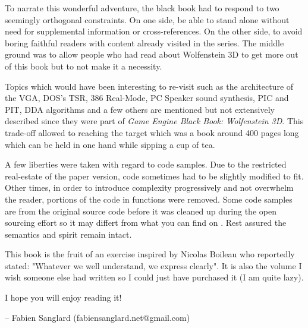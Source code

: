  To narrate this wonderful adventure, the black book had to respond to two seemingly orthogonal constraints. On one side,  be able to stand alone without need for supplemental information or cross-references. On the other side, to avoid boring faithful readers with content already visited in the series. The middle ground was to allow people who had read about Wolfenstein 3D to get more out of this book but to not make it a necessity.\\
 \par
 Topics which would have been interesting to re-visit such as the architecture of the VGA, DOS's TSR, 386 Real-Mode, PC Speaker sound synthesis, PIC and PIT, DDA algorithms and a few others are mentioned but not extensively described since they were part of \textit{Game Engine Black Book: Wolfenstein 3D}. This trade-off allowed to reaching the target which was a book around 400 pages long which can be held  in one hand while sipping a cup of tea.\\
\par
A few liberties were taken with regard to code samples. Due to the restricted real-estate of the paper version, code sometimes had to be slightly modified to fit. Other times, in order to introduce complexity progressively and not overwhelm the reader, portions of the code in functions were removed. Some code samples are from the original source code before it was cleaned up during the open sourcing effort so it may differt from what you can find on . Rest assured the semantics and spirit remain intact.\\
\par 
This book is the fruit of an exercise inspired by Nicolas Boileau who reportedly stated: "Whatever we well understand, we express clearly". It is also the volume I wish someone else had written so I could just have purchased it (I am quite lazy).\\
\par
I hope you will enjoy reading it!\\
\par
-- Fabien Sanglard (fabiensanglard.net@gmail.com)
